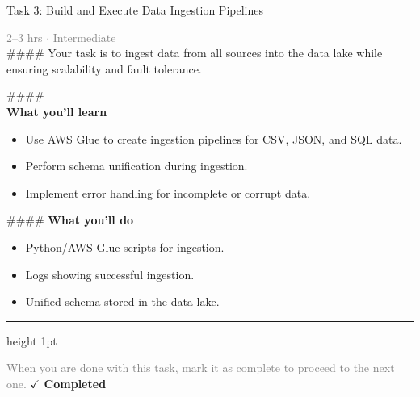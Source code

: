 \documentclass[10pt,a4paper]{article}
\begin{document}
\begin{taskbox}{Task 3: Build and Execute Data Ingestion Pipelines}

    {\small \textcolor{gray}{2--3 hrs $\cdot$ Intermediate}}\\[12pt]

    \#\#\#\#   
Your task is to ingest data from all sources into the data lake while ensuring scalability and fault tolerance.

\#\#\#\# \\[10pt]
\vspace{8pt}
{\large \textbf{\textcolor{brandLight}{What you'll learn}}}\\[4pt]  
\begin{itemize}
    \item Use AWS Glue to create ingestion pipelines for CSV, JSON, and SQL data.  
    \item Perform schema unification during ingestion.  
    \item Implement error handling for incomplete or corrupt data.  
\end{itemize}

\#\#\#\# \vspace{8pt}
{\large \textbf{\textcolor{brandLight}{What you'll do}}}\\[4pt]  
\begin{itemize}
    \item Python/AWS Glue scripts for ingestion.  
    \item Logs showing successful ingestion.  
    \item Unified schema stored in the data lake.\par
\end{itemize}

    \vspace{16pt}

    \textcolor{cardBorder}{\hrule height 1pt}\vspace{8pt}

    \small \textcolor{gray}{When you are done with this task, mark it as complete to proceed to the next one.} \hfill \textbf{\textcolor{brandDark}{$\checkmark$ Completed}}

\end{taskbox}
\end{document}
